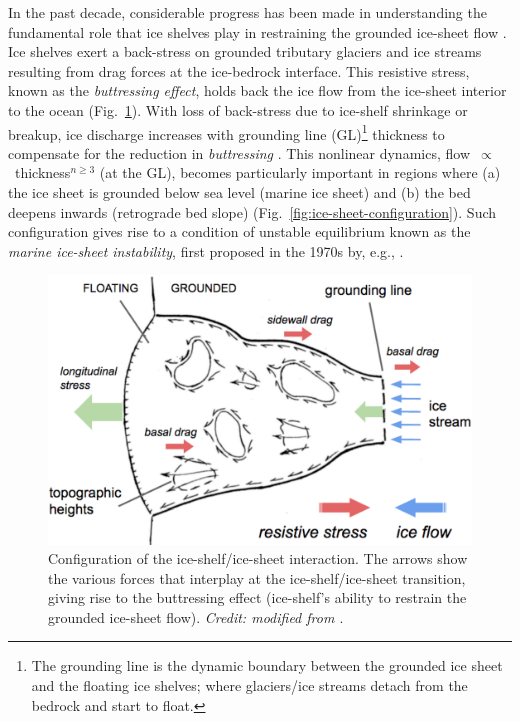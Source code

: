 In the past decade, considerable progress has been made in understanding the
fundamental role that ice shelves play in restraining the grounded ice-sheet
flow \parencite[e.g.,][]{Schoof2007, Goldberg2009, Gudmundsson2013}. Ice shelves exert a back-stress on grounded tributary glaciers and ice streams resulting from drag forces
at the ice-bedrock interface. This resistive stress, known as the \emph{buttressing effect},
holds back the ice flow from the ice-sheet interior to the ocean (Fig.~\ref{fig:ice-shelf-buttressing}).
With loss of back-stress due to ice-shelf shrinkage or breakup, ice discharge
increases with grounding line (GL)\footnote{The grounding line
is the dynamic boundary between the grounded ice sheet and the floating ice shelves;
where glaciers/ice streams detach from the bedrock and start to float.} thickness to
compensate for the reduction in \emph{buttressing} \parencite{Schoof2007, Joughin2012}. This nonlinear dynamics,
flow~$\propto$~thickness$^{n \geqslant 3}$ (at the GL), becomes particularly important in
regions where (a) the ice sheet is
grounded below sea level (marine ice sheet) and (b) the bed deepens inwards
(retrograde bed slope) (Fig.~\ref{fig:ice-sheet-configuration}). Such configuration gives rise to a condition of unstable
equilibrium known as the \emph{marine ice-sheet instability},
first proposed in the 1970s by, e.g., \textcite{Weertman1974, Mercer1978}.

\begin{figure}[!h]
  \centering
  \includegraphics[width=.87\textwidth]{img/ice_shelf_buttressing.png}
  \caption[Configuration of the ice-shelf/ice-sheet interaction]{
  \ssp \footnotesize
  Configuration of the ice-shelf/ice-sheet interaction. The arrows show the various forces that interplay at the ice-shelf/ice-sheet transition, giving rise to the buttressing effect (ice-shelf's ability to restrain the grounded ice-sheet flow). {\it Credit: modified from \textcite{Hughes2014}}.
  }
  \label{fig:ice-shelf-buttressing}
\end{figure}


